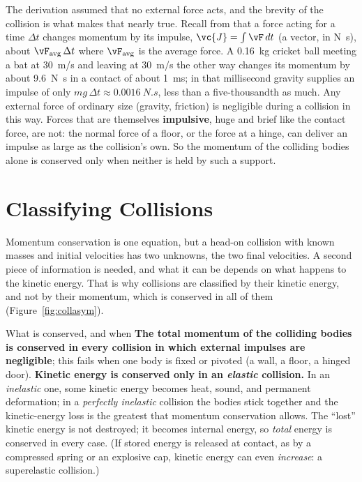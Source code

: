 The derivation assumed that no external force acts, and the brevity of the collision is what makes that
nearly true. Recall from  that a force acting for a time $\Delta t$ changes momentum by its
impulse, $\vc{J}=\int\vF\,dt$ (a vector, in \si{N.s}), about $\vF_{\text{avg}}\,\Delta t$ where
$\vF_{\text{avg}}$ is the average force. A \SI{0.16}{kg} cricket ball meeting a bat at
\SI{30}{m/s} and leaving at \SI{30}{m/s} the other way changes its momentum by about \SI{9.6}{N.s} in a
contact of about \SI{1}{ms}; in that millisecond gravity supplies an impulse of only
$mg\,\Delta t\approx\SI{0.0016}{N.s}$, less than a five-thousandth as much. Any external force of
ordinary size (gravity, friction) is negligible during a collision in this way. Forces that are
themselves \textbf{impulsive}, huge and brief like the contact force, are not: the normal force of a
floor, or the force at a hinge, can deliver an impulse as large as the collision's own. So the
momentum of the colliding bodies alone is conserved only when neither is held by such a support.

\section{Classifying Collisions}

Momentum conservation is one equation, but a head-on collision with known masses and initial velocities
has two unknowns, the two final velocities. A second piece of information is needed, and what it can be
depends on what happens to the kinetic energy. That is why collisions are classified by their kinetic
energy, and not by their momentum, which is conserved in all of them (Figure~\ref{fig:collasym}).

\begin{keybox}{What is conserved, and when}
\textbf{The total momentum of the colliding bodies is conserved in every collision in which external
impulses are negligible}; this fails when one body is fixed or pivoted (a wall, a floor, a hinged door).
\textbf{Kinetic energy is conserved
only in an \emph{elastic} collision.} In an \emph{inelastic} one, some kinetic energy becomes heat,
sound, and permanent deformation; in a \emph{perfectly inelastic} collision the bodies stick together
and the kinetic-energy loss is the greatest that momentum conservation allows. The ``lost'' kinetic
energy is not destroyed; it becomes internal energy, so \emph{total} energy is conserved in every case.
(If stored energy is released at contact, as by a compressed spring or an explosive cap, kinetic energy
can even \emph{increase}: a superelastic collision.)
\end{keybox}


